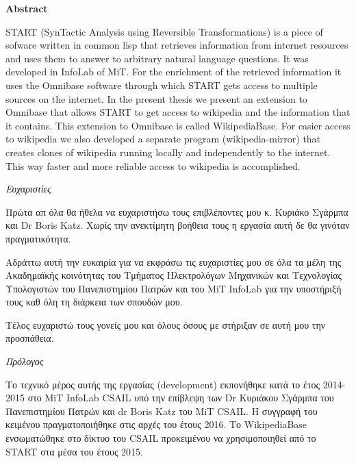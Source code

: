 {\vfill

\large\textbf{Abstract}

  START (SynTactic Analysis using Reversible Transformations) is a
  piece of sofware written in common lisp that retrieves information
  from internet resources and uses them to answer to arbitrary natural
  language questions. It was developed in InfoLab of MiT. For the
  enrichment of the retrieved information it uses the Omnibase
  software through which START gets access to multiple sources on the
  internet. In the present thesis we present an extension to Omnibase
  that allows START to get access to wikipedia and the information
  that it contains. This extension to Omnibase is called
  WikipediaBase. For easier access to wikipedia we also developed a
  separate program (wikipedia-mirror) that creates clones of wikipedia
  running locally and independently to the internet. This way faster
  and more reliable access to wikipedia is accomplished.


\clearpage

  \thispagestyle{plain}
  \vspace*{1in}
  \begin{center}
    \begin{Large}
      \textit{Ευχαριστίες}
    \end{Large}
  \end{center}

  Πρώτα απ όλα θα ήθελα να ευχαριστήσω τους επιβλέποντες μου κ. Κυριάκο
  Σγάρμπα και Dr Boris Katz. Χωρίς την ανεκτίμητη βοήθεια τους η εργασία
  αυτή δε θα γινόταν πραγματικότητα.

  Αδράττω αυτή την ευκαιρία για να εκφράσω τις ευχαριστίες μου σε όλα τα
  μέλη της Ακαδημαϊκής κοινότητας του Τμήματος Ηλεκτρολόγων Μηχανικών
  και Τεχνολογίας Υπολογιστών του Πανεπιστημίου Πατρών και του MiT
  InfoLab για την υποστήριξή τους καθ όλη τη διάρκεια των σπουδών μου.


  Τέλος ευχαριστώ τους γονείς μου και όλους όσους με στήριξαν σε αυτή
  μου την προσπάθεια.

  \afterpage{\blankpage}
  \newpage

  \thispagestyle{plain}
  \vspace*{1in}
  \begin{center}
    \begin{Large}
      \textit{Πρόλογος}
    \end{Large}
  \end{center}

  Το τεχνικό μέρος αυτής της εργασίας (development) εκπονήθηκε κατά το
  έτος 2014-2015 στο MiT InfoLab CSAIL υπό την επίβλεψη των Dr
  Κυριάκου Σγάρμπα του Πανεπιστημίου Πατρών και dr Boris Katz του MiT
  CSAIL. Η συγγραφή του κειμένου πραγματοποιήθηκε στις αρχές του έτους
  2016. Το WikipediaBase ενσωματώθηκε στο δίκτυο του CSAIL προκειμένου
  να χρησιμοποιηθεί από το START στα μέσα του έτους 2015.

  \afterpage{\blankpage}


}
